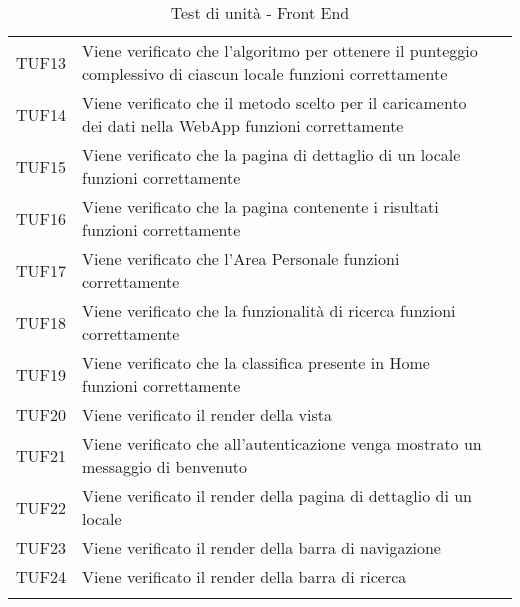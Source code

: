 \begin{longtable}{ m{}<{\centering}  m{}<{\centering}  m{}<{\centering} }
	TUF13 & Viene verificato che l'algoritmo per ottenere il punteggio complessivo di ciascun locale funzioni correttamente & \Ni \\
	TUF14 & Viene verificato che il metodo scelto per il caricamento dei dati nella WebApp funzioni correttamente & \Ni \\
	TUF15 & Viene verificato che la pagina di dettaglio di un locale funzioni correttamente & \Ni \\
	TUF16 & Viene verificato che la pagina contenente i risultati funzioni correttamente & \Ni \\
	TUF17 & Viene verificato che l'Area Personale funzioni correttamente & \Ni \\
	TUF18 & Viene verificato che la funzionalità di ricerca funzioni correttamente & \Ni \\
	TUF19 & Viene verificato che la classifica presente in Home funzioni correttamente & \Ni \\
	TUF20 & Viene verificato il render della vista & \Su \\
	TUF21 & Viene verificato che all'autenticazione venga mostrato un messaggio di benvenuto & \Su \\
	TUF22 & Viene verificato il render della pagina di dettaglio di un locale & \Su \\
	TUF23 & Viene verificato il render della barra di navigazione & \Su \\
	TUF24 & Viene verificato il render della barra di ricerca & \Su \\
    \caption{Test di unità - Front End}
\end{longtable}	

%
%	 
%	
%
